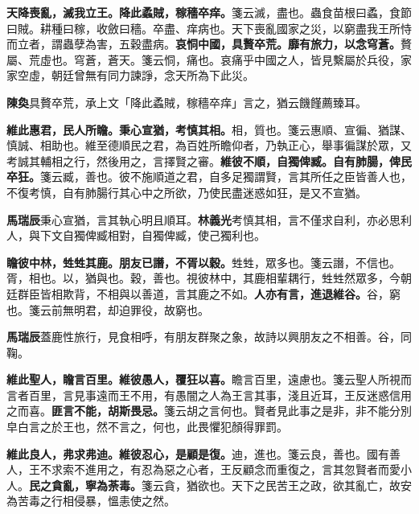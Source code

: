 \textbf{天降喪亂，滅我立王。降此蟊賊，稼穡卒痒。}{\footnotesize 箋云滅，盡也。蟲食苗根曰蟊，食節曰賊。耕種曰稼，收斂曰穡。卒盡、痒病也。天下喪亂國家之災，以窮盡我王所恃而立者，謂蟲孽為害，五穀盡病。}\textbf{哀恫中國，具贅卒荒。靡有旅力，以念穹蒼。}{\footnotesize 贅屬、荒虛也。穹蒼，蒼天。箋云恫，痛也。哀痛乎中國之人，皆見繫屬於兵役，家家空虛，朝廷曾無有同力諫諍，念天所為下此災。}

\begin{quoting}\textbf{陳奐}具贅卒荒，承上文「降此蟊賊，稼穡卒痒」言之，猶云饑饉薦臻耳。\end{quoting}

\textbf{維此惠君，民人所瞻。秉心宣猶，考慎其相。}{\footnotesize 相，質也。箋云惠順、宣徧、猶謀、慎誠、相助也。維至德順民之君，為百姓所瞻仰者，乃執正心，舉事徧謀於眾，又考誠其輔相之行，然後用之，言擇賢之審。}\textbf{維彼不順，自獨俾臧。自有肺腸，俾民卒狂。}{\footnotesize 箋云臧，善也。彼不施順道之君，自多足獨謂賢，言其所任之臣皆善人也，不復考慎，自有肺腸行其心中之所欲，乃使民盡迷惑如狂，是又不宣猶。}

\begin{quoting}\textbf{馬瑞辰}秉心宣猶，言其執心明且順耳。\textbf{林義光}考慎其相，言不僅求自利，亦必思利人，與下文自獨俾臧相對，自獨俾臧，使己獨利也。\end{quoting}

\textbf{瞻彼中林，甡甡其鹿。朋友已譖，不胥以穀。}{\footnotesize 甡甡，眾多也。箋云譖，不信也。胥，相也。以，猶與也。穀，善也。視彼林中，其鹿相輩耦行，甡甡然眾多，今朝廷群臣皆相欺背，不相與以善道，言其鹿之不如。}\textbf{人亦有言，進退維谷。}{\footnotesize 谷，窮也。箋云前無明君，却迫罪役，故窮也。}

\begin{quoting}\textbf{馬瑞辰}蓋鹿性旅行，見食相呼，有朋友群聚之象，故詩以興朋友之不相善。谷，同鞠。\end{quoting}

\textbf{維此聖人，瞻言百里。維彼愚人，覆狂以喜。}{\footnotesize 瞻言百里，遠慮也。箋云聖人所視而言者百里，言見事遠而王不用，有愚闇之人為王言其事，淺且近耳，王反迷惑信用之而喜。}\textbf{匪言不能，胡斯畏忌。}{\footnotesize 箋云胡之言何也。賢者見此事之是非，非不能分別皁白言之於王也，然不言之，何也，此畏懼犯顏得罪罰。}

\textbf{維此良人，弗求弗迪。維彼忍心，是顧是復。}{\footnotesize 迪，進也。箋云良，善也。國有善人，王不求索不進用之，有忍為惡之心者，王反顧念而重復之，言其忽賢者而愛小人。}\textbf{民之貪亂，寧為荼毒。}{\footnotesize 箋云貪，猶欲也。天下之民苦王之政，欲其亂亡，故安為苦毒之行相侵暴，慍恚使之然。}

